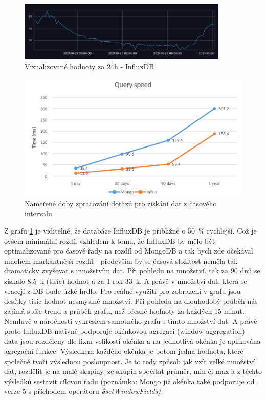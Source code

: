 \documentclass{article}
\begin{document}
\begin{figure}[htbp]
\includegraphics[width=10cm]{images/simple_query_24h.png} 
\centering 
\caption{Vizualizované hodnoty za 24h - InfluxDB} 
\end{figure}


\begin{figure}[htbp]
\includegraphics[width=15cm]{images/select_interval_graph.png}
\centering 
\caption{Naměřené doby zpracování dotazů pro získání dat z časového intervalu\label{graf:simple:query}} 
\end{figure}

Z grafu \ref{graf:simple:query} je viditelné, že databáze InfluxDB je přibližně o 50~\% rychlejší. Což je ovšem minimální rozdíl vzhledem k tomu, že InfluxDB by mělo být optimalizované pro časové řady na rozdíl od MongoDB a tak bych zde očekával mnohem markantnější rozdíl - především by se časová složitost neměla tak dramaticky zvyšovat s množstvím dat. Při pohledu na množství, tak za 90 dnů se získalo 8,5~k (tisíc) hodnot a za 1 rok 33~k. A právě v množství dat, která se vracejí z DB bude úzké hrdlo. Pro reálné využití pro zobrazení v grafu jsou desítky tisíc hodnot nesmyslné množství. Při pohledu na dlouhodobý průběh nás zajímá spíše trend a průběh grafu, než přesné hodnoty za každých 15 minut. Nemluvě o náročnosti vykreslení samotného grafu s tímto množství dat. A právě proto InfluxDB nativně podporuje okénkovou agregaci (window aggregation) - data jsou rozděleny dle fixní velikosti okénka a na jednotlivá okénka je aplikována agregační funkce. Výsledkem každého okénka je potom jedna hodnota, které společně tvoří výslednou posloupnost. Je to tedy způsob jak vzít velké množství dat, rozdělit je na malé skupiny, ze skupin spočítat průměr, min či max a z těchto výsledků sestavit cílovou řadu (poznámka: Mongo již okénka také podporuje od verze 5 s příchodem operátoru \it{\$setWindowFields}).
\end{document}
